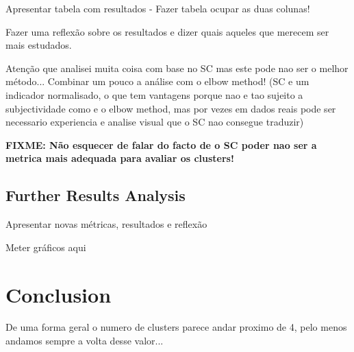 \documentclass[9pt,journal,compsoc]{IEEEtran}
\begin{document}
Apresentar tabela com resultados - Fazer tabela ocupar as duas colunas!

Fazer uma reflexão sobre os resultados e dizer quais aqueles que merecem ser mais estudados.

Atenção que analisei muita coisa com base no SC mas este pode nao ser o melhor método... Combinar um pouco a análise com o elbow method! (SC e um indicador normalisado, o que tem vantagens porque nao e tao sujeito a subjectividade como e o elbow method, mas por vezes em dados reais pode ser necessario experiencia e analise visual que o SC nao consegue traduzir)

\textbf{FIXME: Não esquecer de falar do facto de o SC poder nao ser a metrica mais adequada para avaliar os clusters!}

\subsection{Further Results Analysis}

Apresentar novas métricas, resultados e reflexão

Meter gráficos aqui

\section{Conclusion}
\label{conclusions}

De uma forma geral o numero de clusters parece andar proximo de 4, pelo menos andamos sempre a volta desse valor...




\end{document}
